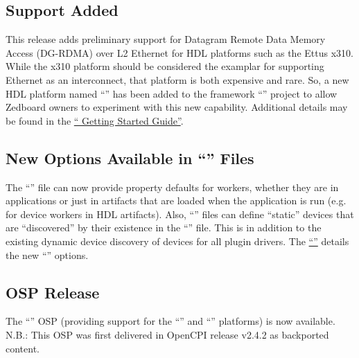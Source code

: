 \subsection{ Support Added}
\label{sec:25_dgrdma}
This release adds preliminary support for Datagram Remote Data Memory Access (DG-RDMA) over L2 Ethernet for HDL platforms such as the Ettus x310.\\

While the x310 platform should be considered the examplar for supporting Ethernet as an interconnect, that platform is both expensive and rare.  So, a new HDL platform named ``'' has been added to the framework ``'' project to allow Zedboard owners to experiment with this new capability.  Additional details may be found in the \href{https://opencpi.gitlab.io/releases/latest/rst/platform/hdl/platforms/zed_ether/zed_ether-gsg.html}{`` Getting Started Guide''}.\\

\subsection{New Options Available in ``'' Files}
\label{sec:25_sysxml}
The ``'' file can now provide property defaults for workers, whether they are in applications or just in artifacts that are loaded when the application is run (e.g. for device workers in HDL artifacts).  Also, ``'' files can define ``static'' devices that are ``discovered'' by their existence in the ``'' file.  This is in addition to the existing dynamic device discovery of devices for all plugin drivers.  The \href{https://opencpi.gitlab.io/releases/latest/docs/OpenCPI_User_Guide.pdf}{``''} details the new ``'' options.\\

\subsection{ OSP Release}
\label{sec:25_zcu111}
The ``'' OSP (providing support for the ``'' and ``'' platforms) is now available.\\

N.B.: This OSP was first delivered in OpenCPI release v2.4.2 as backported content.\\

